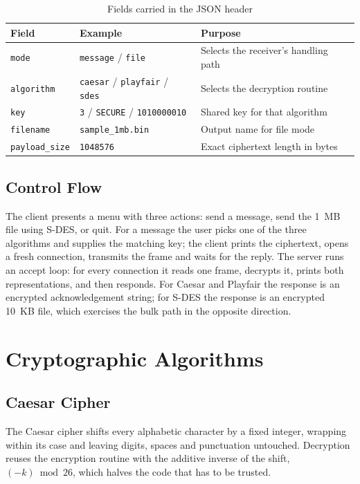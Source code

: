 \begin{table}[!ht]
\centering
\caption{Fields carried in the JSON header}
\label{tab:header}
\begin{tabular}{|l|l|l|}
\hline
\textbf{Field} & \textbf{Example} & \textbf{Purpose} \\ \hline
\texttt{mode} & \texttt{message} / \texttt{file} & Selects the receiver's handling path \\ \hline
\texttt{algorithm} & \texttt{caesar} / \texttt{playfair} / \texttt{sdes} & Selects the decryption routine \\ \hline
\texttt{key} & \texttt{3} / \texttt{SECURE} / \texttt{1010000010} & Shared key for that algorithm \\ \hline
\texttt{filename} & \texttt{sample\_1mb.bin} & Output name for file mode \\ \hline
\texttt{payload\_size} & \texttt{1048576} & Exact ciphertext length in bytes \\ \hline
\end{tabular}
\end{table}

\section{Control Flow}
The client presents a menu with three actions: send a message, send the 1~MB file
using S-DES, or quit. For a message the user picks one of the three algorithms and
supplies the matching key; the client prints the ciphertext, opens a fresh
connection, transmits the frame and waits for the reply. The server runs an
accept loop: for every connection it reads one frame, decrypts it, prints both
representations, and then responds. For Caesar and Playfair the response is an
encrypted acknowledgement string; for S-DES the response is an encrypted 10~KB
file, which exercises the bulk path in the opposite direction.

\chapter{Cryptographic Algorithms}

\section{Caesar Cipher}
The Caesar cipher shifts every alphabetic character by a fixed integer, wrapping
within its case and leaving digits, spaces and punctuation untouched. Decryption
reuses the encryption routine with the additive inverse of the shift,
$(-k) \bmod 26$, which halves the code that has to be trusted.

